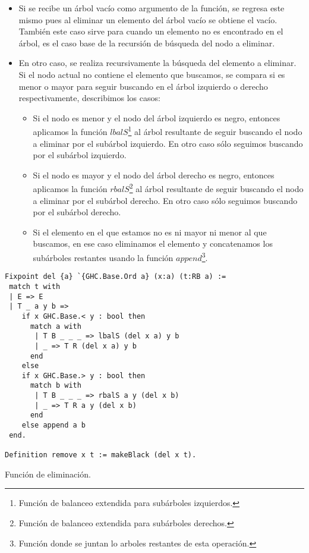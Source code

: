 \begin{itemize}
    \item Si se recibe un \'arbol vacío como argumento de la funci\'on, se regresa este mismo pues
    al eliminar un elemento del \'arbol vacío se obtiene el vacío. También este caso sirve para
    cuando un elemento no es encontrado en el \'arbol, es el caso base de la recursi\'on de
    búsqueda del nodo a eliminar.
    \item En otro caso, se realiza recursivamente la búsqueda del elemento a eliminar. Si el nodo
    actual no contiene el elemento que buscamos, se compara si es menor o mayor para seguir
    buscando en el \'arbol izquierdo o derecho respectivamente, describimos los casos:
    \begin{itemize}
        \item Si el nodo es menor y el nodo del \'arbol izquierdo es negro, entonces aplicamos la 
        funci\'on \hyperref[lbalS]{$lbalS$}\footnote{Funci\'on de balanceo extendida para 
        subárboles izquierdos.} al \'arbol resultante de seguir buscando el nodo a eliminar por el 
        subárbol izquierdo. 
        En otro caso s\'olo seguimos buscando por el subárbol izquierdo.
        \item Si el nodo es mayor y el nodo del \'arbol derecho es negro, entonces aplicamos la 
        funci\'on \hyperref[lbalS]{$rbalS$}\footnote{Funci\'on de balanceo extendida para 
        subárboles derechos.} al \'arbol resultante de seguir buscando el nodo a eliminar por el 
        subárbol derecho. 
        En otro caso s\'olo seguimos buscando por el subárbol derecho.
        \item Si el elemento en el que estamos no es ni mayor ni menor al que buscamos, en ese
        caso eliminamos el elemento y concatenamos los subárboles restantes usando la función 
        \hyperref[func_app]{$append$}\footnote{Funci\'on donde se juntan lo arboles restantes de 
        esta operaci\'on.}.
    \end{itemize}
    
\end{itemize}

\begin{listing}[!ht]
\centering
\captionsetup{justification=centering}
\begin{verbatim}
Fixpoint del {a} `{GHC.Base.Ord a} (x:a) (t:RB a) :=
 match t with
 | E => E
 | T _ a y b =>
    if x GHC.Base.< y : bool then
      match a with
       | T B _ _ _ => lbalS (del x a) y b
       | _ => T R (del x a) y b
      end
    else
    if x GHC.Base.> y : bool then
      match b with
       | T B _ _ _ => rbalS a y (del x b)
       | _ => T R a y (del x b)
      end
    else append a b
 end.

Definition remove x t := makeBlack (del x t).
\end{verbatim}
\caption{Función de eliminación.}
\label{func_del}
\end{listing}

